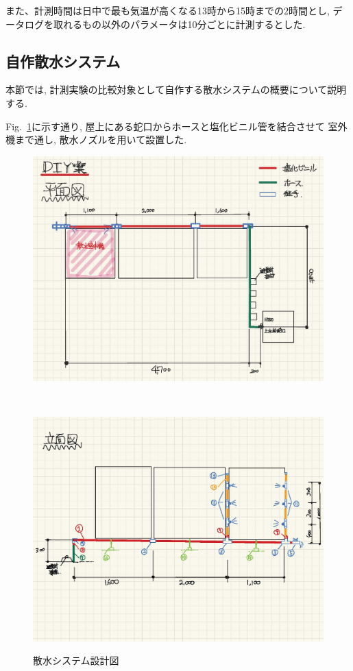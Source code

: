 \documentclass[a4j,fleqn,dvipdfmx,uplatex]{jsarticle}
\newcommand{\figref}[1]{Fig.\ \ref{#1}}
\begin{document}
また、計測時間は日中で最も気温が高くなる13時から15時までの2時間とし, 
データログを取れるもの以外のパラメータは10分ごとに計測するとした. 


\subsection{自作散水システム}
本節では, 計測実験の比較対象として自作する散水システムの概要について説明する. 

\figref{fig2:watering_sys}に示す通り, 屋上にある蛇口からホースと塩化ビニル管を結合させて
室外機まで通し, 散水ノズルを用いて設置した. 

\begin{figure}[htb]
  \centering
    \begin{minipage}[b]{\linewidth}
      \centering
      \includegraphics[width=0.8\linewidth]{img/平面図.jpg}
      \label{subfig:平面図}
    \end{minipage}\\
    \begin{minipage}[b]{\linewidth}
      \centering
      \includegraphics[width=0.8\linewidth]{img/裏手立面図.jpg}
      \label{subfig:裏手立面図}
    \end{minipage}
  \caption{散水システム設計図}
  \label{fig2:watering_sys}
\end{figure}
\end{document}
